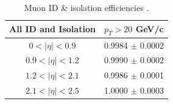 \documentclass[oneside, a4paper, 11pt, ]{report}
\begin{document}
\begin{table} \label{tab-MuonEfficiencies}
\begin{center}
\begin{tabular}{|c|c|}
\hline
	\textbf{All ID and Isolation} & $p_T > 20$ GeV/c \\
\hline	
	$0 < |\eta| < 0.9$ & 0.9984 $\pm$ 0.0002 \\
	$0.9 < |\eta| < 1.2$ & 0.9990 $\pm$ 0.0002 \\
	$1.2 < |\eta| < 2.1$ & 0.9986 $\pm$ 0.0001 \\
	$2.1 < |\eta| < 2.5$ & 1.0000 $\pm$ 0.0003 \\
\hline	
\end{tabular}
\caption{Muon ID \& isolation efficiencies \cite{MuonEfficiencies}.}
\end{center}
\end{table}



\end{document}
